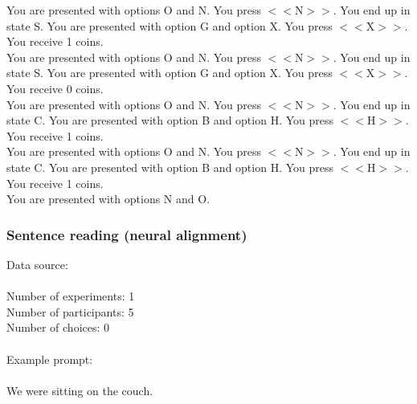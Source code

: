 \documentclass[pdflatex,sn-nature]{sn-jnl}%
\theoremstyle{thmstyleone}%
\theoremstyle{thmstyletwo}%
\theoremstyle{thmstylethree}%
\begin{document}
You are presented with options O and N. You press $<<$N$>>$. You end up in state S. You are presented with option G and option X. You press $<<$X$>>$. You receive 1 coins. $~$\\ 
You are presented with options O and N. You press $<<$N$>>$. You end up in state S. You are presented with option G and option X. You press $<<$X$>>$. You receive 0 coins. $~$\\ 
You are presented with options O and N. You press $<<$N$>>$. You end up in state C. You are presented with option B and option H. You press $<<$H$>>$. You receive 1 coins. $~$\\ 
You are presented with options O and N. You press $<<$N$>>$. You end up in state C. You are presented with option B and option H. You press $<<$H$>>$. You receive 1 coins. $~$\\ 
You are presented with options N and O.

\subsubsection*{Sentence reading (neural alignment)}

Data source: \cite{tuckute2024driving} \\ $~$ \\
Number of experiments: 1 $~$\\ 
Number of participants: 5 $~$\\ 
Number of choices: 0 $~$\\ 
 $~$\\ 
Example prompt: $~$\\ 
 $~$\\ 
We were sitting on the couch.

\newpage

\end{document}
